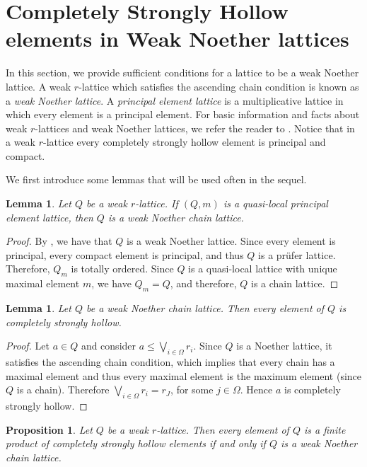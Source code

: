 \documentclass[11pt,english]{amsart}
\newtheorem{proposition}[theorem]{Proposition}
\newtheorem{lemma}[theorem]{Lemma}
\theoremstyle{definition}
\numberwithin{equation}{section}
\theoremstyle{remark}
\def\leq{\leqslant}
\begin{document}
	\section{Completely Strongly Hollow elements in Weak Noether lattices}
	\label{cwn}
	
	In this section, we provide sufficient conditions for a lattice to be a weak Noether lattice.
	A weak $r$-lattice which satisfies the ascending chain condition is known as a \emph{weak Noether lattice}. A \emph{principal element lattice} is a multiplicative lattice in which every element is a principal element. For basic information and facts about weak $r$-lattices and weak Noether lattices, we refer the reader to \cite{AJ-PE-1996}. Notice that in a weak $r$-lattice every completely strongly hollow element is principal and compact. 
	
	We first introduce some lemmas that will be used often in the sequel.
	
	\begin{lemma}\label{L5.1}
		Let $Q$ be a weak $r$-lattice. If $(Q,m)$ is a quasi-local principal element lattice, then $Q$ is a weak Noether chain lattice. 
	\end{lemma}
	
	\begin{proof}
		By \cite[Theorem~1.1]{AJ-PE-1996}, we have that $Q$ is a weak Noether lattice. Since every element is principal,  every compact element is principal, and thus $Q$ is a pr\"ufer lattice. Therefore, $Q_m$ is totally ordered. Since $Q$ is a quasi-local lattice with unique maximal element $m$, we have  $Q_m=Q$, and therefore, $Q$ is a chain lattice. 
	\end{proof}
	
	\begin{lemma}\label{L5.2}
		Let $Q$ be a weak Noether chain lattice. Then every element of $Q$ is completely strongly hollow.
	\end{lemma}
	
	\begin{proof}
		Let $a\in Q$ and consider $a\leq\bigvee_{i\in\Omega}r_i$. Since $Q$ is a Noether lattice, it satisfies the ascending chain condition, which implies that every chain has a maximal element and thus every maximal element is the maximum element (since $Q$ is a chain). Therefore $\bigvee_{i\in\Omega}r_i=r_J$, for some $j\in\Omega$. Hence $a$ is completely strongly hollow.
	\end{proof}
	
	\begin{proposition}\label{P5.3}
		Let $Q$ be a weak $r$-lattice. Then every element of $Q$ is a finite product of completely strongly hollow elements if and only if $Q$ is a weak Noether chain lattice.
	\end{proposition}
	
\end{document}
